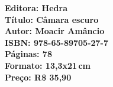 \vfill
\noindent\begin{minipage}[c]{1\linewidth}
{\small\textbf{
\hspace*{-.1cm}Editora: Hedra\\
Título: Câmara escuro\\
Autor: Moacir Amâncio\\ 
ISBN: 978-65-89705-27-7\\
Páginas: 78\\
Formato: 13,3x21\,cm\\
Preço: R\$ 35,90\\
}}
\end{minipage}
\pagebreak





